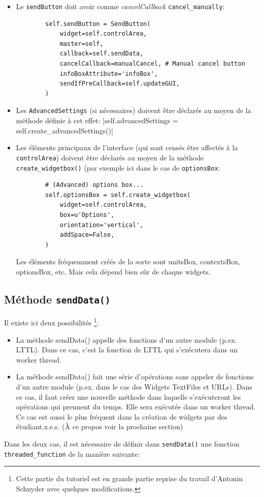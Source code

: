 \documentclass{article}
\begin{document}
\begin{itemize}
    \item Le \texttt{sendButton} doit avoir comme \textit{cancelCallback} \texttt{cancel\_manually}:
    \begin{verbatim}
        self.sendButton = SendButton(
            widget=self.controlArea,
            master=self,
            callback=self.sendData,
            cancelCallback=manualCancel, # Manual cancel button
            infoBoxAttribute='infoBox',
            sendIfPreCallback=self.updateGUI,
        )
    \end{verbatim}
    \item Les \texttt{AdvancedSettings} (si nécessaires) doivent être déclarés au moyen de la méthode définie à cet effet:
    |self.advancedSettings = self.create_advancedSettings()|
    \item Les éléments principaux de l'interface (qui sont censés être affectés à la \texttt{controlArea}) doivent être déclarés au moyen de la méthode \texttt{create\_widgetbox()} (par exemple ici dans le cas de \texttt{optionsBox}: 
    \begin{verbatim}
        # (Advanced) options box...
        self.optionsBox = self.create_widgetbox(
            widget=self.controlArea,
            box=u'Options',
            orientation='vertical',
            addSpace=False,
        )
    \end{verbatim}
    Les éléments fréquemment créés de la sorte sont unitsBox, contextsBox, optionsBox, etc. Mais cela dépend bien sûr de chaque widgets.
\end{itemize}

\subsection{Méthode \texttt{sendData()}}

Il existe ici deux possibilités \footnote{Cette partie du tutoriel est en grande partie reprise du travail d'Antonin Schnyder avec quelques modifications.}:
\begin{itemize}
    \item La méthode sendData() appelle des fonctions d’un autre module (p.ex. LTTL). Dans ce cas, c'est la fonction de LTTL qui s’exécutera dans un worker thread.
    \item La méthode sendData() fait une série d’opérations sans appeler de fonctions d’un autre module (p.ex. dans le cas des Widgets TextFiles et URLs). Dans ce cas, il faut créer une nouvelle méthode dans laquelle s'exécuteront les opérations qui prennent du temps. Elle sera exécutée dans un worker thread. Ce cas est aussi le plus fréquent dans la création de widgets par des étudiant.x.e.s. (À ce propos voir la prochaine section)
\end{itemize}
\vspace{5mm}
Dans les deux cas, il est nécessaire de définir dans \texttt{sendData()} une fonction \texttt{threaded\_function} de la manière suivante: 
\end{document}
